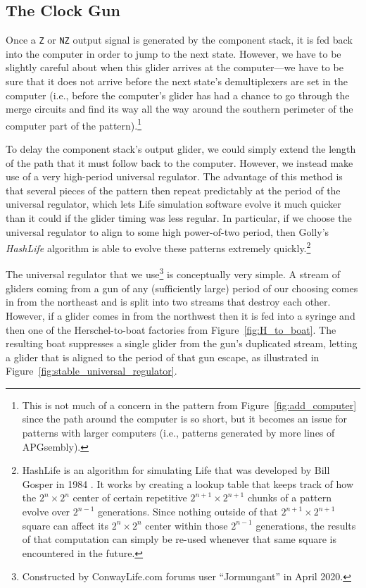 \subsection{The Clock Gun}

Once a \texttt{Z} or \texttt{NZ} output signal is generated by the component stack, it is fed back into the computer in order to jump to the next state. However, we have to be slightly careful about when this glider arrives at the computer---we have to be sure that it does not arrive before the next state's demultiplexers are set in the computer (i.e., before the computer's glider has had a chance to go through the merge circuits and find its way all the way around the southern perimeter of the computer part of the pattern).\footnote{This is not much of a concern in the pattern from Figure~\ref{fig:add_computer} since the path around the computer is so short, but it becomes an issue for patterns with larger computers (i.e., patterns generated by more lines of APGsembly).}

To delay the component stack's output glider, we could simply extend the length of the path that it must follow back to the computer. However, we instead make use of a very high-period universal regulator. The advantage of this method is that several pieces of the pattern then repeat predictably at the period of the universal regulator, which lets Life simulation software evolve it much quicker than it could if the glider timing was less regular. In particular, if we choose the universal regulator to align to some high power-of-two period, then Golly's \emph{HashLife} algorithm is able to evolve these patterns extremely quickly.\footnote{HashLife is an algorithm for simulating Life that was developed by Bill Gosper in 1984 \cite{Gos84}. It works by creating a lookup table that keeps track of how the $2^{n} \times 2^{n}$ center of certain repetitive $2^{n+1} \times 2^{n+1}$ chunks of a pattern evolve over $2^{n-1}$ generations. Since nothing outside of that $2^{n+1} \times 2^{n+1}$ square can affect its $2^{n} \times 2^{n}$ center within those $2^{n-1}$ generations, the results of that computation can simply be re-used whenever that same square is encountered in the future.}

The universal regulator that we use\footnote{Constructed by ConwayLife.com forums user ``Jormungant'' in April 2020.} is conceptually very simple. A stream of gliders coming from a gun of any (sufficiently large) period of our choosing comes in from the northeast and is split into two streams that destroy each other. However, if a glider comes in from the northwest then it is fed into a syringe and then one of the Herschel-to-boat factories from Figure~\ref{fig:H_to_boat}. The resulting boat suppresses a single glider from the gun's duplicated stream, letting a glider that is aligned to the period of that gun escape, as illustrated in Figure~\ref{fig:stable_universal_regulator}.

